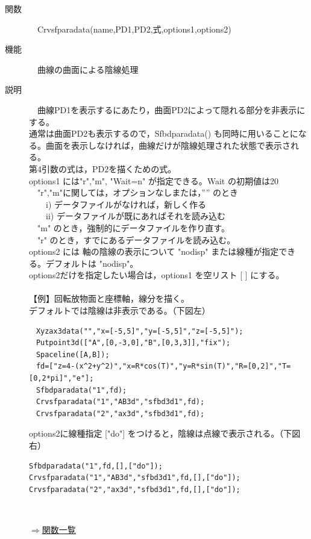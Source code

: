 \documentclass[papersize,a4paper,12pt,uplatex]{jsarticle}
\begin{document}
\begin{description}
\hypertarget{crvsfparadata}{}
\item[関数]　Crvsfparadata(name,PD1,PD2,式,options1,options2)
\item[機能]　曲線の曲面による陰線処理
\item[説明]　曲線PD1を表示するにあたり，曲面PD2によって隠れる部分を非表示にする。\\
通常は曲面PD2も表示するので，Sfbdparadata() も同時に用いることになる。曲面を表示しなければ，曲線だけが陰線処理された状態で表示される。\\
第4引数の式は，PD2を描くための式。\\
options1 には"r","m", "Wait=n" が指定できる。Wait の初期値は20\\
　"r","m"に関しては，オプションなしまたは，”” のとき\\
　　i) データファイルがなければ，新しく作る\\
　　ii) データファイルが既にあればそれを読み込む\\
　"m"  のとき，強制的にデータファイルを作り直す。\\
　"r" のとき，すでにあるデータファイルを読み込む。\\ 
options2 には 軸の陰線の表示について "nodisp" または線種が指定できる。デフォルトは "nodisp"。\\
options2だけを指定したい場合は，options1 を空リスト [ ] にする。\\
　\\
【例】回転放物面と座標軸，線分を描く。\\
デフォルトでは陰線は非表示である。（下図左）
\begin{verbatim}
　Xyzax3data("","x=[-5,5]","y=[-5,5]","z=[-5,5]");
　Putpoint3d(["A",[0,-3,0],"B",[0,3,3]],"fix");
　Spaceline([A,B]);
　fd=["z=4-(x^2+y^2)","x=R*cos(T)","y=R*sin(T)","R=[0,2]","T=[0,2*pi]","e"];
　Sfbdparadata("1",fd);
　Crvsfparadata("1","AB3d","sfbd3d1",fd);
　Crvsfparadata("2","ax3d","sfbd3d1",fd);
\end{verbatim}
options2に線種指定 ["do"] をつけると，陰線は点線で表示される。（下図右）
\begin{verbatim}
Sfbdparadata("1",fd,[],["do"]);
Crvsfparadata("1","AB3d","sfbd3d1",fd,[],["do"]);
Crvsfparadata("2","ax3d","sfbd3d1",fd,[],["do"]);
\end{verbatim}

　　　　　　　
　\\
\begin{flushright} \hyperlink{functionlist3d}{$\Rightarrow$関数一覧}\end{flushright}


\end{description}
\end{document}
